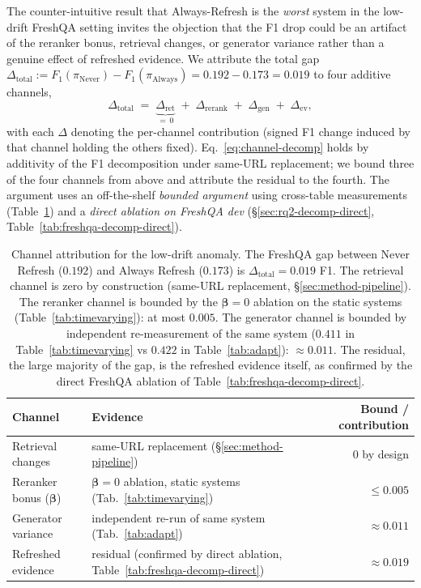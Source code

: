 \documentclass[pdflatex,sn-basic]{sn-jnl}
\begin{document}
The counter-intuitive result that Always-Refresh is the \emph{worst} system in the low-drift FreshQA setting invites the objection that the F1 drop could be an artifact of the reranker bonus, retrieval changes, or generator variance rather than a genuine effect of refreshed evidence. We attribute the total gap $\Delta_{\text{total}} := F_1(\pi_{\mathrm{Never}}) - F_1(\pi_{\mathrm{Always}}) = 0.192 - 0.173 = 0.019$ to four additive channels,
\begin{equation}
\label{eq:channel-decomp}
\Delta_{\mathrm{total}} \;=\; \underbrace{\Delta_{\mathrm{ret}}}_{=\,0} \;+\; \Delta_{\mathrm{rerank}} \;+\; \Delta_{\mathrm{gen}} \;+\; \Delta_{\mathrm{ev}},
\end{equation}
with each $\Delta$ denoting the per-channel contribution (signed F1 change induced by that channel holding the others fixed). Eq.~\ref{eq:channel-decomp} holds by additivity of the F1 decomposition under same-URL replacement; we bound three of the four channels from above and attribute the residual to the fourth. The argument uses an off-the-shelf \emph{bounded argument} using cross-table measurements (Table~\ref{tab:freshqa-decomp}) and a \emph{direct ablation on FreshQA dev} (§\ref{sec:rq2-decomp-direct}, Table~\ref{tab:freshqa-decomp-direct}).

\begin{table}[htbp]
\caption{Channel attribution for the low-drift anomaly. The FreshQA gap between Never Refresh ($0.192$) and Always Refresh ($0.173$) is $\Delta_{\text{total}}{=}0.019$ F1. The retrieval channel is zero by construction (same-URL replacement, §\ref{sec:method-pipeline}). The reranker channel is bounded by the $\boldsymbol{\beta}{=}0$ ablation on the static systems (Table~\ref{tab:timevarying}): at most $0.005$. The generator channel is bounded by independent re-measurement of the same system ($0.411$ in Table~\ref{tab:timevarying} vs $0.422$ in Table~\ref{tab:adapt}): $\approx 0.011$. The residual, the large majority of the gap, is the refreshed evidence itself, as confirmed by the direct FreshQA ablation of Table~\ref{tab:freshqa-decomp-direct}.}
\label{tab:freshqa-decomp}
\centering
\begin{tabular}{llr}
\toprule
Channel & Evidence & Bound / contribution \\
\midrule
Retrieval changes & same-URL replacement (§\ref{sec:method-pipeline}) & $0$ by design \\
Reranker bonus ($\boldsymbol{\beta}$) & $\boldsymbol{\beta}{=}0$ ablation, static systems (Tab.~\ref{tab:timevarying}) & $\le 0.005$ \\
Generator variance & independent re-run of same system (Tab.~\ref{tab:adapt}) & $\approx 0.011$ \\
\midrule
Refreshed evidence & residual (confirmed by direct ablation, Table~\ref{tab:freshqa-decomp-direct}) & $\approx 0.019$ \\
\bottomrule
\end{tabular}
\end{table}
\end{document}
